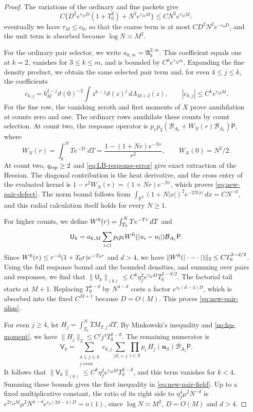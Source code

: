 \begin{proof}
The variations of the ordinary and fine packets give
\[
 C\{D^2e^{\tau_MD}(1+T_0^2)+N^2e^{\tau_MM}\}
 \le CN^2e^{\tau_MM}:
\]
eventually we have $\tau_M\le c_0$, so that the coarse term is at
most $CD^2N^2e^{-c_0D}$, and the unit term is absorbed because
$\log N\asymp M^2$.

For the ordinary pair selector, we write
$a_{k,m}=\mathfrak A_k^{2,m}$. This coefficient equals one at $k=2$,
vanishes for $3\le k\le m$, and is bounded by $C^ke^{\tau_Mm}$.
Expanding the fine density product, we obtain the same selected pair
term and, for even $4\le j\le k$, the coefficients
\[
 c_{k,j}=b_M^{2-j}\vartheta(0)^{-2}
 \int z^{k-j}\vartheta(z)^j\,d\Lambda_{M+2}(z),
 \qquad |c_{k,j}|\le C^ke^{\tau_MM}.
\]
For the fine row, the vanishing zeroth and first moments of $X$ prove
annihilation at counts zero and one. The ordinary rows annihilate these
counts by count selection. At count two, the response operator is
$p_1p_2(\mathcal B_{A_0}+W_N(r)\mathcal B_{A_1})\mathsf P$, where
\[
 W_N(r)=\int_0^NT e^{-Tr}\,dT
 =\frac{1-(1+Nr)e^{-Nr}}{r^2},\qquad W_N(0)=N^2/2.
\]
At count two, $q_{\rm rsp}\ge2$ and
\eqref{eq:LB-response-error} give exact extraction of the Hessian. The diagonal contribution is the heat derivative, and the cross entry
of the evaluated kernel is $1-r^2W_N(r)=(1+Nr)e^{-Nr}$, which proves
\eqref{eq:new-pair-defect}. The norm bound follows from
$\int_{\mathbb R^d}(1+N|x|)^2e^{-2N|x|}\,dx=CN^{-d}$, and this radial
calculation itself holds for every $N\ge1$.

For higher counts, we define
$W^{\rm fi}(r)=\int_{T_0}^NT e^{-Tr}\,dT$ and
\[
 \mathsf U_k=a_{k,M}\sum_{i<l}p_ip_lW^{\rm fi}(|u_i-u_l|)
 \mathcal B_{A_1}\mathsf P.
\]
Since $W^{\rm fi}(r)\le r^{-2}(1+T_0r)e^{-T_0r}$ and $d>4$, we have
$\|W^{\rm fi}(|\cdot-\cdot|)\|_2\le CT_0^{2-d/2}$. Using the full
response bound and the bounded densities, and summing over pairs and
responses, we find that
$\|\mathsf U_k\|_{(k)}\le C^k\eta_f^2e^{\tau_MM}T_0^{2-d/2}$.
The factorial tail starts at $M+1$. Replacing $T_0^{4-d}$ by
$N^{4-d}$ costs a factor $e^{c_0(d-4)D}$, which is absorbed into the
fixed $C^{M+1}$ because $D=O(M)$. This proves
\eqref{eq:new-pair-alias}.

For even $j\ge4$, let $H_j=\int_{T_0}^NT M_{T,j}\,dT$. By
Minkowski's inequality and \eqref{eq:hp-moment}, we have
$\|H_j\|_2\le C^jj^4T_0^{2-d}$. The remaining numerator is
\[
 \mathsf V_k=\sum_{\substack{4\le j\le k\\j\text{ even}}}
 c_{k,j}\sum_{|S|=j}\prod_{i\in S}p_i\,
 H_j(\mathbf u_S)\mathcal B_{A_1}\mathsf P.
\]
It follows that
$\|\mathsf V_k\|_{(k)}\le C^k\eta_f^2e^{\tau_MM}T_0^{2-d}$, and this
term vanishes for $k<4$. Summing these bounds gives the first
inequality in \eqref{eq:new-pair-field}. Up to a fixed multiplicative constant, the ratio of its right side
to $\eta_f^4\mu^2N^{-d}$ is
$e^{2\tau_MM}\mu^2N^{4-d}e^{c_0(2d-4)D}=o(1)$, since
$\log N\asymp M^2$, $D=O(M)$ and $d>4$.
\end{proof}


